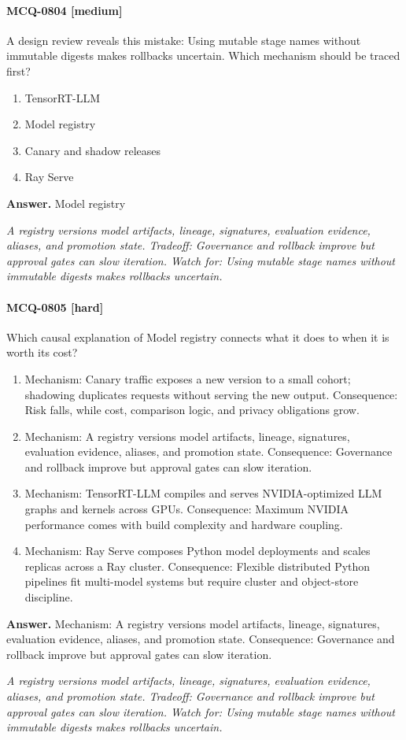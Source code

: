 \paragraph{MCQ-0804 [medium]} A design review reveals this mistake: Using mutable stage names without immutable digests makes rollbacks uncertain. Which mechanism should be traced first?
\begin{enumerate}[label=\Alph*.]
\item TensorRT-LLM
\item Model registry
\item Canary and shadow releases
\item Ray Serve
\end{enumerate}
\noindent\textbf{Answer.} Model registry
\par\textit{A registry versions model artifacts, lineage, signatures, evaluation evidence, aliases, and promotion state. Tradeoff: Governance and rollback improve but approval gates can slow iteration. Watch for: Using mutable stage names without immutable digests makes rollbacks uncertain.}
\paragraph{MCQ-0805 [hard]} Which causal explanation of Model registry connects what it does to when it is worth its cost?
\begin{enumerate}[label=\Alph*.]
\item Mechanism: Canary traffic exposes a new version to a small cohort; shadowing duplicates requests without serving the new output. Consequence: Risk falls, while cost, comparison logic, and privacy obligations grow.
\item Mechanism: A registry versions model artifacts, lineage, signatures, evaluation evidence, aliases, and promotion state. Consequence: Governance and rollback improve but approval gates can slow iteration.
\item Mechanism: TensorRT-LLM compiles and serves NVIDIA-optimized LLM graphs and kernels across GPUs. Consequence: Maximum NVIDIA performance comes with build complexity and hardware coupling.
\item Mechanism: Ray Serve composes Python model deployments and scales replicas across a Ray cluster. Consequence: Flexible distributed Python pipelines fit multi-model systems but require cluster and object-store discipline.
\end{enumerate}
\noindent\textbf{Answer.} Mechanism: A registry versions model artifacts, lineage, signatures, evaluation evidence, aliases, and promotion state. Consequence: Governance and rollback improve but approval gates can slow iteration.
\par\textit{A registry versions model artifacts, lineage, signatures, evaluation evidence, aliases, and promotion state. Tradeoff: Governance and rollback improve but approval gates can slow iteration. Watch for: Using mutable stage names without immutable digests makes rollbacks uncertain.}
